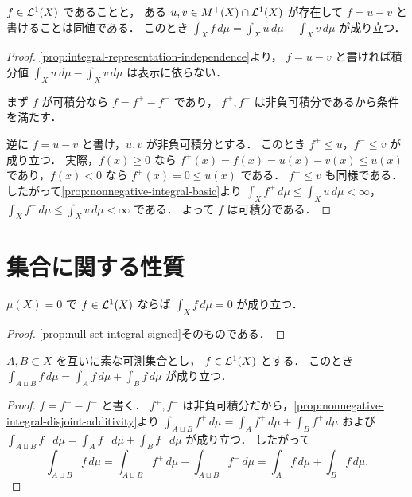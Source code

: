 \begin{proposition}[非負関数による表示]\label{prop:integrable-as-difference}
$f\in\mathcal L^1(X)$ であることと，
ある $u,v\in M^+(X)\cap\mathcal L^1(X)$ が存在して $f=u-v$ と書けることは同値である．
このとき $\int_X f\,d\mu=\int_X u\,d\mu-\int_X v\,d\mu$ が成り立つ．
\end{proposition}
\begin{proof}
\cref{prop:integral-representation-independence}より，
$f=u-v$ と書ければ積分値 $\int_X u\,d\mu-\int_X v\,d\mu$ は表示に依らない．

まず $f$ が可積分なら $f=f^+-f^-$ であり，
$f^+,f^-$ は非負可積分であるから条件を満たす．

逆に $f=u-v$ と書け，$u,v$ が非負可積分とする．
このとき $f^+\le u$，$f^-\le v$ が成り立つ．
実際，$f(x)\ge 0$ なら $f^+(x)=f(x)=u(x)-v(x)\le u(x)$ であり，$f(x)<0$ なら $f^+(x)=0\le u(x)$ である．
$f^-\le v$ も同様である．
したがって\cref{prop:nonnegative-integral-basic}より
$\int_X f^+\,d\mu\le \int_X u\,d\mu<\infty$，
$\int_X f^-\,d\mu\le \int_X v\,d\mu<\infty$ である．
よって $f$ は可積分である．
\end{proof}

\section{集合に関する性質}

\begin{proposition}[零集合上では積分は消える]\label{prop:integral-zero-on-null-set}
$\mu(X)=0$ で $f\in\mathcal L^1(X)$ ならば $\int_X f\,d\mu=0$ が成り立つ．
\end{proposition}
\begin{proof}
\cref{prop:null-set-integral-signed}そのものである．
\end{proof}

\begin{proposition}[互いに素な集合への加法性]\label{prop:integral-disjoint-additivity}
$A,B \subset X$ を互いに素な可測集合とし，
$f\in\mathcal L^1(X)$ とする．
このとき $\int_{A \sqcup B} f\,d\mu=\int_A f\,d\mu+\int_B f\,d\mu$ が成り立つ．
\end{proposition}
\begin{proof}
$f=f^+-f^-$ と書く．
$f^+,f^-$ は非負可積分だから，\cref{prop:nonnegative-integral-disjoint-additivity}より
$\int_{A \sqcup B} f^+\,d\mu=\int_A f^+\,d\mu+\int_B f^+\,d\mu$ および
$\int_{A \sqcup B} f^-\,d\mu=\int_A f^-\,d\mu+\int_B f^-\,d\mu$ が成り立つ．
したがって
\[
\int_{A \sqcup B} f\,d\mu
=\int_{A \sqcup B} f^+\,d\mu-\int_{A \sqcup B} f^-\,d\mu
=\int_A f\,d\mu+\int_B f\,d\mu.
\]
\end{proof}

